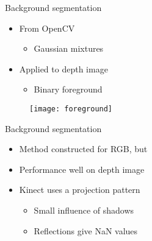 
\begin{frame}{Background segmentation}
	\begin{itemize}

	\item From OpenCV
	\begin{itemize}
	\item Gaussian mixtures
	\end{itemize}
	\item Applied to depth image
	\begin{itemize}
	\item Binary foreground
    \end{itemize}
	\end{itemize}

	
	\begin{figure}[H]
	\begin{center}
	\texttt{[image: foreground]}
	\end{center}
	\end{figure}
	
\end{frame}
\begin{frame}{Background segmentation}

\begin{itemize}
	\item Method constructed for RGB, but
	\item Performance well on depth image
	\item Kinect uses a projection pattern
	\begin{itemize}
		\item Small influence of shadows
		\item Reflections give NaN values
	\end{itemize}
	\end{itemize}
\end{frame}